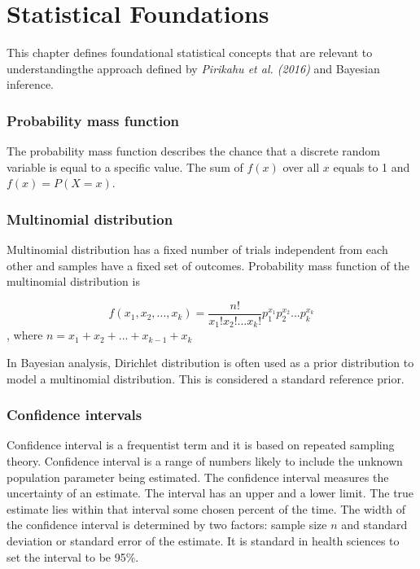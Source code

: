 \chapter{Statistical Foundations} \label{sec:Consepts}

This chapter defines foundational statistical concepts that are relevant to understandingthe approach defined by \textit{Pirikahu et al. (2016)} and Bayesian inference.

\subsection{Probability mass function} \label{PropabilityMassFunction}

The probability mass function describes the chance that a discrete random variable is equal to a specific value. The sum of $f(x)$ over all $x$ equals to 1 and $f(x) = P(X = x)$.\cite{pmf}

\subsection{Multinomial distribution}\label{MultinomialDistribution}

Multinomial distribution has a fixed number of trials independent from each other and samples have a fixed set of outcomes. Probability mass function of the multinomial distribution is

\begin{equation}
f(x_1, x_2, ..., x_k) = \frac{n!}{x_1!x_2!...x_k!}p_1^{x_1}p_2^{x_2}...p_k^{x_k}
\end{equation}, where $n = x_1 + x_2 + ... + x_{k-1} + x_k$\cite{multinomialDistribution}\cite{SINHARAY201098}

In Bayesian analysis, Dirichlet distribution is often used as a prior distribution to model a multinomial distribution. \cite{SINHARAY201098} This is considered a standard reference prior.\cite{Pirikahu2016BayesianMO}

\subsection{Confidence intervals}\label{ConfidenceIntervals}

Confidence interval is a frequentist term and it is based on repeated sampling theory.\cite{Schoot2014BayesianA} Confidence interval is a range of numbers likely to include the unknown population parameter being estimated.\cite{Illowsky2013IntroductorySO} The confidence interval measures the uncertainty of an estimate. The interval has an upper and a lower limit. The true estimate lies within that interval some chosen percent of the time. The width of the confidence interval is determined by two factors: sample size $n$ and standard deviation or standard error of the estimate. It is standard in health sciences to set the interval to be 95\%.\cite{Hespanhol2019UnderstandingAI}

